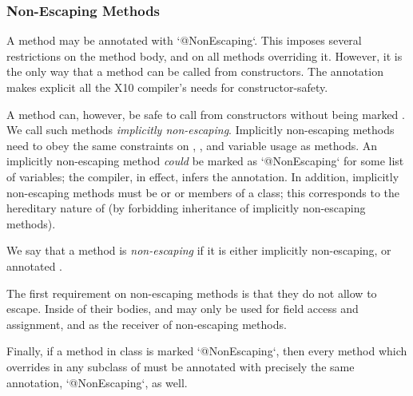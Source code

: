 \subsubsection{Non-Escaping Methods}


A method may be annotated with \xcd`@NonEscaping`.  This
imposes several restrictions on the method body, and on all methods overriding
it.  However, it is the only way that a method can be called from
constructors.  The
 annotation makes explicit all the X10 compiler's needs for
constructor-safety.

A method can, however, be safe to call from constructors without being marked
. We call such methods {\em implicitly non-escaping}.
Implicitly non-escaping methods need to obey the same constraints on
, , and variable usage as  methods. An
implicitly non-escaping method {\em could} be marked as
\xcd`@NonEscaping` for some list of variables; the compiler, in
effect, infers the annotation. In addition, implicitly non-escaping methods
must be  or  or members of a  class; this
corresponds to the hereditary nature of  (by forbidding
inheritance of implicitly non-escaping methods).

We say that a method is {\em non-escaping} if it is either implicitly
non-escaping, or annotated .

The first requirement on non-escaping methods is that they do not allow
 to escape. Inside of their bodies,  and  may
only be used for field access and assignment, and as the receiver of
non-escaping methods.

Finally, if a method  in class  is marked
\xcd`@NonEscaping`, then every method which overrides  in any
subclass of  must be annotated with precisely the same annotation,
\xcd`@NonEscaping`, as well.

